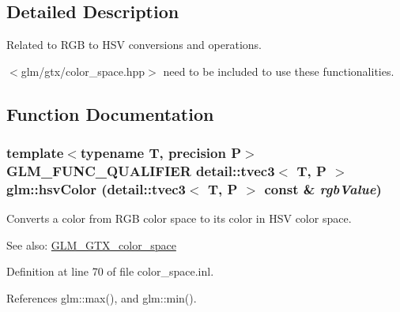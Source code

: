 \subsection{Detailed Description}
Related to RGB to HSV conversions and operations. 

$<$glm/gtx/color\_\-space.hpp$>$ need to be included to use these functionalities. 

\subsection{Function Documentation}
\hypertarget{group__gtx__color__space_g2532e85174ba333c4f60127d03d71655}{
\subsubsection[hsvColor]{\setlength{\rightskip}{0pt plus 5cm}template$<$typename T, precision P$>$ GLM\_\-FUNC\_\-QUALIFIER detail::tvec3$<$ T, P $>$ glm::hsvColor (detail::tvec3$<$ T, P $>$ const \& {\em rgbValue})}}
\label{group__gtx__color__space_g2532e85174ba333c4f60127d03d71655}


Converts a color from RGB color space to its color in HSV color space. \begin{Desc}
\item[See also:]\hyperlink{group__gtx__color__space}{GLM\_\-GTX\_\-color\_\-space} \end{Desc}


Definition at line 70 of file color\_\-space.inl.

References glm::max(), and glm::min().

